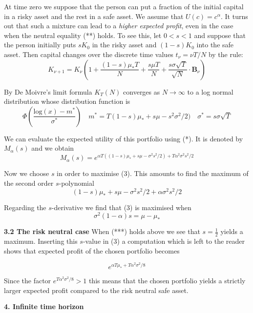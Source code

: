 \documentclass[12pt]{amsart}
\begin{document}
\medskip

\noindent
At time zero we suppose that the person can put
a fraction of the initial capital in a risky
asset and the rest in a safe asset. We assume that
$U(c)= c^\alpha$.
It turns out that such a mixture can lead to a {\it{higher
expected profit}}, even in the case when the neutral equality (**) holds.
To see this, let $0<s<1$ and suppose that the person 
initially puts $sK_0$ in the risky asset and $(1-s)K_0$ into
the safe asset.
Then  capital changes over 
the discrete time values $t_\nu=\nu T/N$
by the rule:
\[
K_{\nu+1}=K_\nu(1+\frac{(1-s)\mu_\ast T}{ N}+
\frac{s\mu T}{N}+\frac{s\sigma\sqrt{T}}{\sqrt{N}}\cdot
\mathbf B_\nu)\tag{1}
\]

\medskip

\noindent
By De Moivre's limit formula
$K_T(N)$ converges as 
$N\to\infty$ to a log normal distribution whose distribution function is
\[
\Phi(\frac{\text{log}(x)-m^*}{\sigma^*})\quad
m^*=T(1-s)\mu_\ast+s\mu-s^2\sigma^2/2)\quad 
\sigma^*=s\sigma\sqrt{ T}\tag{2}
\]




\noindent
We can evaluate the expected utility of this portfolio using  (*).
It is denoted by $M_\alpha(s)$ and we
obtain 
\[
M_\alpha(s)=e^{\alpha T((1-s)\mu_\ast+s\mu-\sigma^2s^2/2)+
T\alpha^2\sigma^2s^2/2}\tag{3}
\]

\medskip

\noindent
Now we choose $s$ in order to maximise (3). This amounts 
to find the maximum of the second order  $s$-polynomial
\[
(1-s)\mu_\ast+s\mu-\sigma^2s^2/2+
\alpha\sigma^2s^2/2
\]

\noindent
Regarding the $s$-derivative we find that (3) is maximised when
\[
\sigma^2(1-\alpha)s=\mu-\mu_\ast
\]

\medskip



 \noindent
{\bf 3.2 The risk neutral case}
When (***)  holds above we see that $s=\frac{1}{2}$ yields a maximum.
Inserting this $s$-value in (3) a computation which is left to the reader
shows that expected profit of the chosen portfolio becomes


\[
e^{\alpha T\mu_*+T\alpha^2\sigma^2/8}
\]

\noindent
Since the factor $e^{T\alpha^2\sigma^2/8}>1$ this means that the
chosen portfolio yields a strictly larger expected profit 
compared to the risk neutral safe asset.


\newpage


\centerline {\bf {4. Infinite time horizon}}
\end{document}
